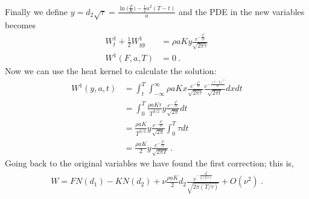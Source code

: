 \documentclass[10pt]{article}
\numberwithin{equation}{section}
\begin{document}
Finally we define $y=d_2 \sqrt{\tau} = \frac{ \ln\bigl( \frac{F}{K}\bigr) - \frac{1}{2} a^2 (T-t)}{a}$ and the PDE in the new variables becomes
\begin{equation}\label{order_1}
	\begin{split}
	W_t^{1} + \frac{1}{2}  W_{yy}^{1} &=\rho a  K  y \frac{e^{-\frac{y^2}{2 \tau}}}{\sqrt{2\pi \tau}}\\
	W^{1}(F,a,T)&=0\:.
	\end{split}
\end{equation}
Now we can use the heat kernel to calculate the solution:
\begin{equation*}
	\begin{split}
	W^{1}(y,a,t)&=\int_{t}^{T}\int_{-\infty}^{\infty} \rho a  K  x \frac{e^{-\frac{x^2}{2 \tau}}}{\sqrt{2\pi \tau}} \frac{e^{-\frac{(x-y)^2}{2 t}}}{\sqrt{2\pi t}} dx dt\\
	&=\int_{0}^{T} \frac{\rho a  K \tau}{T^{3/2}} y \frac{e^{-\frac{y^2}{2T}}}{\sqrt{2\pi}} d t\\
	&=\frac{\rho a  K }{T^{3/2}} y \frac{e^{-\frac{y^2}{2T}}}{\sqrt{2\pi}} \int_{0}^{T} \tau d t\\
	&=\frac{\rho a  K }{2} y \frac{e^{-\frac{y^2}{2T}}}{\sqrt{2\pi T}}\:.
	\end{split}
\end{equation*}
Going back to the original variables we have found the first correction; this is,
\begin{equation*}
	\begin{split}
	W=FN(d_1)-KN(d_2)+\nu \frac{\rho a K }{2} d_2 \frac{e^{-\frac{d_2^2}{2(T/\tau)}} }{\sqrt{2\pi (T/\tau)}} +O(\nu^2)\:.
	\end{split}
\end{equation*}




\end{document}
